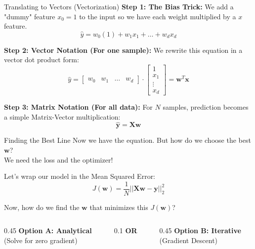 \begin{frame}{Translating to Vectors (Vectorization)}
    \textbf{Step 1: The Bias Trick:}
    We add a "dummy" feature $x_0 = 1$ to the input so we have each weight multiplied by a $x$ feature.
    $$ \hat{y} = w_0(1) + w_1 x_1 + \dots + w_d x_d $$
    
    \textbf{Step 2: Vector Notation (For one sample):} We rewrite this equation in a vector dot product form:
    $$ \hat{y} = \begin{bmatrix} w_0 & w_1 & \dots & w_d \end{bmatrix} \cdot \begin{bmatrix} 1 \\ x_1 \\ \vdots \\ x_d \end{bmatrix} = \mathbf{w}^T \mathbf{x} $$

    \textbf{Step 3: Matrix Notation (For all data):} For $N$ samples, prediction becomes a simple Matrix-Vector multiplication:
        $$ \mathbf{\hat{y}} = \mathbf{X}\mathbf{w} $$

\end{frame}

\begin{frame}{Finding the Best Line}
    Now we have the equation. But how do we choose the best $\mathbf{w}$?
    \pause
    \\ We need the loss and the optimizer!
    \pause
    
    \vspace{1em}
    Let's wrap our model in the Mean Squared Error:
        $$ J(\mathbf{w}) = \frac{1}{N} ||\mathbf{X}\mathbf{w} - \mathbf{y}||^2_2 $$

    \pause
    \vspace{1em}
    \centering
    Now, how do we find the $\mathbf{w}$ that minimizes this $J(\mathbf{w})$?
    \pause
    
    \vspace{1em}
    \begin{columns}[c]
        \begin{column}{0.45\textwidth}
            \centering
            \textbf{Option A: Analytical}\\
            (Solve for zero gradient)
        \end{column}
        \begin{column}{0.1\textwidth}
            \centering \textbf{OR}
        \end{column}
        \begin{column}{0.45\textwidth}
            \centering
            \textbf{Option B: Iterative}\\
            (Gradient Descent)
        \end{column}
    \end{columns}
\end{frame}


